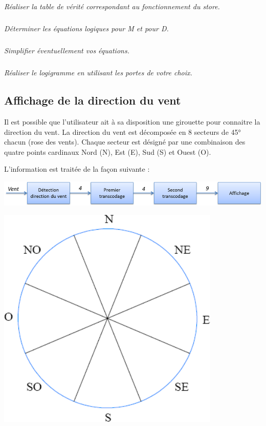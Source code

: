 \documentclass[10pt]{article}
\begin{document}
\subparagraph{}
\textit{Réaliser la table de vérité correspondant au fonctionnement du store.}

\subparagraph{}
\textit{Déterminer les équations logiques pour M et pour D. }

\subparagraph{}
\textit{Simplifier éventuellement vos équations.}

\subparagraph{}
\textit{Réaliser le logigramme en utilisant les portes de votre choix.}

\subsection{Affichage de la direction du vent}

\begin{minipage}[c]{.7\linewidth}
Il est possible que l'utilisateur ait à sa disposition une girouette pour connaitre la direction du vent. 
La direction du vent est décomposée en 8 secteurs de 45° chacun (rose des vents). Chaque secteur est désigné par une combinaison des quatre points cardinaux Nord (N), Est (E), Sud (S) et Ouest (O).

L'information est traitée de la façon suivante : 
\begin{center}
\includegraphics[width=.95\textwidth]{images/chaineMesure}
\end{center}

\end{minipage} \hfill
\begin{minipage}[c]{.28\linewidth}
\begin{center}
\includegraphics[width=.95\textwidth]{images/RoseVents}
\end{center}
\end{minipage} 
\end{document}
